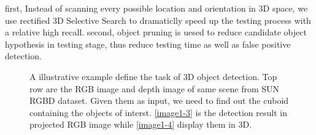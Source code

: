 \documentclass[english]{ccdconf}
\begin{document}
first, Instead of scanning every possible location and orientation in 3D space, we use rectified 3D Selective Search to dramaticlly speed up the testing process with a relative high recall. 
second, object pruning is uesed to reduce candidate object hypothesis in testing stage, thus reduce testing time as well as false positive detection.
\begin{figure}
	\centering
	
	\caption{A illustrative example define the task of 3D object detection. Top row are the RGB image and depth image of same scene from SUN RGBD dataset. Given them as input, we need to find out the cuboid containing the objects of interst. \ref{image1-3} is the detection result in projected RGB image while \ref{image1-4} display them in 3D.}
	\label{pipeline}
\end{figure}
\end{document}
